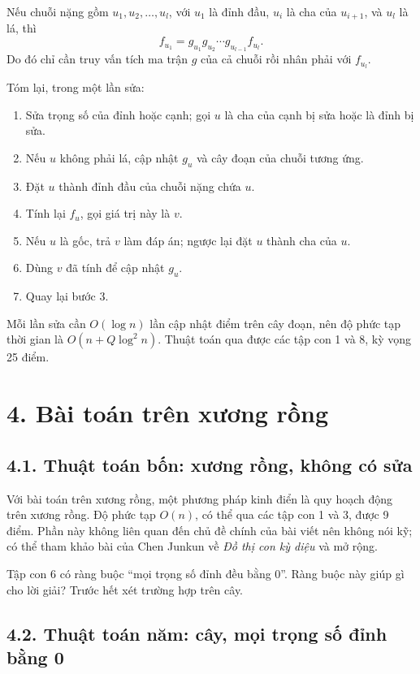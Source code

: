 \documentclass[11pt]{article}
\begin{document}
Nếu chuỗi nặng gồm \(u_1,u_2,\ldots,u_l\), với \(u_1\) là đỉnh đầu, \(u_i\) là
cha của \(u_{i+1}\), và \(u_l\) là lá, thì
\[
  f_{u_1}=g_{u_1}g_{u_2}\cdots g_{u_{l-1}}f_{u_l}.
\]
Do đó chỉ cần truy vấn tích ma trận \(g\) của cả chuỗi rồi nhân phải với
\(f_{u_l}\).

Tóm lại, trong một lần sửa:
\begin{enumerate}
  \item Sửa trọng số của đỉnh hoặc cạnh; gọi \(u\) là cha của cạnh bị sửa
        hoặc là đỉnh bị sửa.
  \item Nếu \(u\) không phải lá, cập nhật \(g_u\) và cây đoạn của chuỗi tương
        ứng.
  \item Đặt \(u\) thành đỉnh đầu của chuỗi nặng chứa \(u\).
  \item Tính lại \(f_u\), gọi giá trị này là \(v\).
  \item Nếu \(u\) là gốc, trả \(v\) làm đáp án; ngược lại đặt \(u\) thành cha
        của \(u\).
  \item Dùng \(v\) đã tính để cập nhật \(g_u\).
  \item Quay lại bước 3.
\end{enumerate}

Mỗi lần sửa cần \(O(\log n)\) lần cập nhật điểm trên cây đoạn, nên độ phức tạp
thời gian là \(O(n+Q\log^2 n)\). Thuật toán qua được các tập con 1 và 8, kỳ
vọng 25 điểm.

\section*{4. Bài toán trên xương rồng}

\subsection*{4.1. Thuật toán bốn: xương rồng, không có sửa}

Với bài toán trên xương rồng, một phương pháp kinh điển là quy hoạch động trên
xương rồng. Độ phức tạp \(O(n)\), có thể qua các tập con 1 và 3, được 9 điểm.
Phần này không liên quan đến chủ đề chính của bài viết nên không nói kỹ; có
thể tham khảo bài của Chen Junkun về \emph{Đồ thị con kỳ diệu} và mở rộng.

Tập con 6 có ràng buộc ``mọi trọng số đỉnh đều bằng 0''. Ràng buộc này giúp gì
cho lời giải? Trước hết xét trường hợp trên cây.

\subsection*{4.2. Thuật toán năm: cây, mọi trọng số đỉnh bằng 0}
\end{document}
